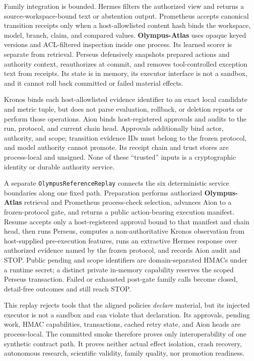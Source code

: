\documentclass[10pt]{article}
\newcommand{\atlas}{\textbf{Olympus-Atlas}}
\begin{document}
Family integration is bounded. Hermes filters the authorized view and returns a
source-workspace-bound text or abstention output. Prometheus accepts canonical
transition receipts only when a host-allowlisted content hash binds the
workspace, model, branch, claim, and compared values. \atlas{} uses opaque keyed
versions and ACL-filtered inspection inside one process. Its learned scorer is
separate from retrieval. Perseus defensively snapshots prepared actions and
authority context, reauthorizes at commit, and removes tool-controlled exception
text from receipts. Its state is in memory, its executor interface is not a
sandbox, and it cannot roll back committed or failed material effects.

Kronos binds each host-allowlisted evidence identifier to an exact local
candidate and metric tuple, but does not parse evaluation, rollback, or deletion
reports or perform those operations. Aion binds host-registered approvals and
audits to the run, protocol, and current chain head. Approvals additionally bind
actor, authority, and scope; transition evidence IDs must belong to the frozen
protocol, and model authority cannot promote. Its receipt chain and trust stores
are process-local and unsigned. None of these
``trusted'' inputs is a cryptographic identity or durable authority service.

A separate \texttt{OlympusReferenceReplay} connects the six deterministic
service boundaries along one fixed path. Preparation performs authorized
\atlas{} retrieval and Prometheus process-check selection, advances Aion to a
frozen-protocol gate, and returns a public action-bearing execution manifest.
Resume accepts only a host-registered approval bound to that manifest and chain
head, then runs Perseus, computes a non-authoritative Kronos observation from
host-supplied pre-execution features, runs an extractive Hermes response over
authorized evidence named by the frozen protocol, and records Aion audit and
STOP. Public pending and scope identifiers are domain-separated HMACs under a
runtime secret; a distinct private in-memory capability reserves the scoped
Perseus transaction. Failed or exhausted post-gate family calls become closed,
detail-free outcomes and still reach STOP.

This replay rejects tools that the aligned policies \emph{declare} material,
but its injected executor is not a sandbox and can violate that declaration.
Its approvals, pending work, HMAC capabilities, transactions, cached retry
state, and Aion heads are process-local. The committed smoke therefore proves
only interoperability of one synthetic contract path. It proves neither actual
effect isolation, crash recovery, autonomous research, scientific validity,
family quality, nor promotion readiness.
\end{document}
